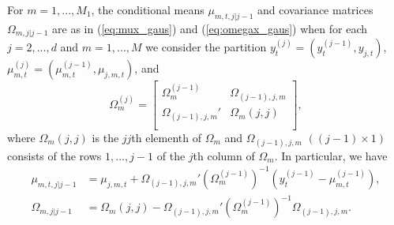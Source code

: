 \documentclass[nojss]{jss} %
\begin{document}
\begin{appendix}
For $m=1,...,M_1$, the conditional means $\mu_{m,t,j|j-1}$ and covariance matrices $\Omega_{m,j|j-1}$ are as in (\ref{eq:mux_gaus}) and (\ref{eq:omegax_gaus}) when for each $j=2,...,d$ and $m=1,...,M$ we consider the partition $y_t^{(j)}=(y_t^{(j-1)},y_{j,t})$, $\mu_{m,t}^{(j)}=(\mu_{m,t}^{(j-1)},\mu_{j,m,t})$, and
\begin{equation}
\Omega_m^{(j)}=
\begin{bmatrix}
\Omega_m^{(j-1)} \quad\enspace & \Omega_{(j-1),j,m} \\
\Omega_{(j-1),j,m}' & \Omega_{m}(j,j)  \\
\end{bmatrix},
\end{equation}
where $\Omega_{m}(j,j)$ is the $jj$th elementh of $\Omega_m$ and $\Omega_{(j-1),j,m}$ $((j-1)\times 1)$  consists of the rows $1,...,j-1$ of the $j$th column of $\Omega_m$.  In particular, we have
\begin{align}
\mu_{m,t,j|j-1} &=\mu_{j,m,t} + \Omega_{(j-1),j,m}'(\Omega_m^{(j-1)})^{-1}(y_t^{(j-1)}-\mu_{m,t}^{(j-1)}),\label{eq:cond_mu_mtj_n}\\
\Omega_{m,j|j-1} &= \Omega_{m}(j,j) - \Omega_{(j-1),j,m}'(\Omega_m^{(j-1)})^{-1} \Omega_{(j-1),j,m}. \label{eq:cond_omega_mj_n}
\end{align}


\end{appendix}
\end{document}
